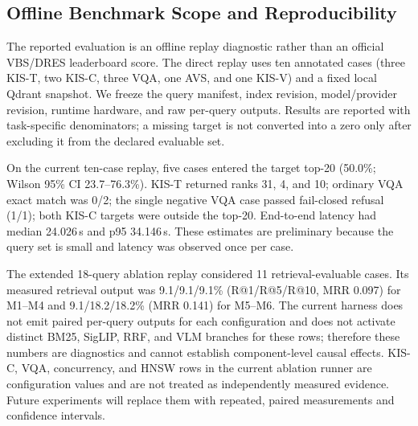 \subsection{Offline Benchmark Scope and Reproducibility}
The reported evaluation is an offline replay diagnostic rather than an official VBS/DRES leaderboard score. The direct replay uses ten annotated cases (three KIS-T, two KIS-C, three VQA, one AVS, and one KIS-V) and a fixed local Qdrant snapshot. We freeze the query manifest, index revision, model/provider revision, runtime hardware, and raw per-query outputs. Results are reported with task-specific denominators; a missing target is not converted into a zero only after excluding it from the declared evaluable set.

On the current ten-case replay, five cases entered the target top-20 (50.0\%; Wilson 95\% CI 23.7--76.3\%). KIS-T returned ranks 31, 4, and 10; ordinary VQA exact match was 0/2; the single negative VQA case passed fail-closed refusal (1/1); both KIS-C targets were outside the top-20. End-to-end latency had median 24.026\,s and p95 34.146\,s. These estimates are preliminary because the query set is small and latency was observed once per case.

The extended 18-query ablation replay considered 11 retrieval-evaluable cases. Its measured retrieval output was 9.1/9.1/9.1\% (R@1/R@5/R@10, MRR 0.097) for M1--M4 and 9.1/18.2/18.2\% (MRR 0.141) for M5--M6. The current harness does not emit paired per-query outputs for each configuration and does not activate distinct BM25, SigLIP, RRF, and VLM branches for these rows; therefore these numbers are diagnostics and cannot establish component-level causal effects. KIS-C, VQA, concurrency, and HNSW rows in the current ablation runner are configuration values and are not treated as independently measured evidence. Future experiments will replace them with repeated, paired measurements and confidence intervals.
